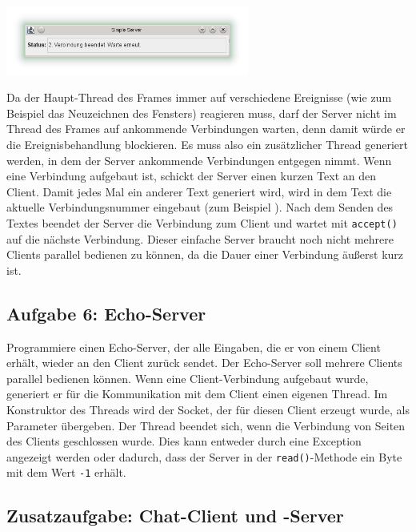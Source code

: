\begin{center}
\includegraphics[width=0.6\textwidth]{./inf/SEKII/43_Java_ClientServer/SimpleServer.png}
\end{center}

Da der Haupt-Thread des Frames immer auf verschiedene Ereignisse (wie zum
Beispiel das Neuzeichnen des Fensters) reagieren muss, darf der Server nicht im
Thread des Frames auf ankommende Verbindungen warten, denn damit würde er die
Ereignisbehandlung blockieren. Es muss also ein zusätzlicher Thread generiert
werden, in dem der Server ankommende Verbindungen entgegen nimmt. Wenn eine
Verbindung aufgebaut ist, schickt der Server einen kurzen Text an den Client.
Damit jedes Mal ein anderer Text generiert wird, wird in dem Text die aktuelle
Verbindungsnummer eingebaut (zum Beispiel ). Nach dem Senden des Textes beendet der Server die Verbindung zum
Client und wartet mit \lstinline|accept()| auf die nächste Verbindung. Dieser
einfache Server braucht noch nicht mehrere Clients parallel bedienen zu können,
da die Dauer einer Verbindung äußerst kurz ist.


\subsection{Aufgabe 6: Echo-Server}

Programmiere einen Echo-Server, der alle Eingaben, die er von einem Client
erhält, wieder an den Client zurück sendet. Der Echo-Server soll mehrere
Clients parallel bedienen können. Wenn eine Client-Verbindung aufgebaut wurde,
generiert er für die Kommunikation mit dem Client einen eigenen Thread. Im
Konstruktor des Threads wird der Socket, der für diesen Client erzeugt wurde,
als Parameter übergeben. Der Thread beendet sich, wenn die Verbindung von
Seiten des Clients geschlossen wurde. Dies kann entweder durch eine Exception
angezeigt werden oder dadurch, dass der Server in der \lstinline|read()|-Methode
ein Byte mit dem Wert \lstinline|-1| erhält.


\subsection{Zusatzaufgabe: Chat-Client und -Server}

